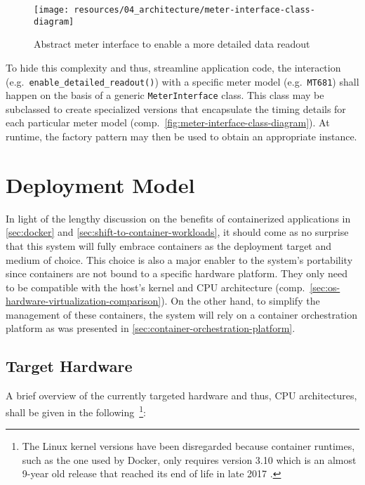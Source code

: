\begin{figure}[hbt]
  \centering
  \texttt{[image: resources/04\_architecture/meter-interface-class-diagram]}
  \caption{Abstract meter interface to enable a more detailed data readout}
  \label{fig:meter-interface-class-diagram}
\end{figure}

\FloatBarrier

To hide this complexity and thus, streamline application code, the interaction (e.g.~\texttt{enable\_detailed\_readout()}) with a specific meter model (e.g.~\texttt{MT681}) shall happen on the basis of a generic \texttt{MeterInterface} class. This class may be subclassed to create specialized versions that encapsulate the timing details for each particular meter model (comp.~\autoref{fig:meter-interface-class-diagram}). At runtime, the factory pattern may then be used to obtain an appropriate instance.


\section{Deployment Model}
\label{sec:deployment-model}

In light of the lengthy discussion on the benefits of containerized applications in \autoref{sec:docker} and \autoref{sec:shift-to-container-workloads}, it should come as no surprise that this system will fully embrace containers as the deployment target and medium of choice. This choice is also a major enabler to the system's portability since containers are not bound to a specific hardware platform. They only need to be compatible with the host's kernel and \acs{CPU} architecture (comp.~\autoref{sec:os-hardware-virtualization-comparison}). On the other hand, to simplify the management of these containers, the system will rely on a container orchestration platform as was presented in \autoref{sec:container-orchestration-platform}.


\subsection{Target Hardware}
\label{sec:deployment-target-hardware}

A brief overview of the currently targeted hardware and thus, \acs{CPU} architectures, shall be given in the following~\footnote{The Linux kernel versions have been disregarded because container runtimes, such as the one used by Docker, only requires version 3.10 which is an almost 9-year old release that reached its end of life in late 2017 \cite{dockerEngine} \cite{lkml2018eol}.}:

